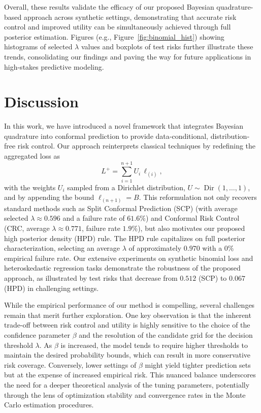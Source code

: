 \documentclass{article}
\begin{document}
Overall, these results validate the efficacy of our proposed Bayesian quadrature-based approach across synthetic settings, demonstrating that accurate risk control and improved utility can be simultaneously achieved through full posterior estimation. Figures (e.g., Figure~\ref{fig:binomial_hist}) showing histograms of selected \(\lambda\) values and boxplots of test risks further illustrate these trends, consolidating our findings and paving the way for future applications in high-stakes predictive modeling.

\section{Discussion}
In this work, we have introduced a novel framework that integrates Bayesian quadrature into conformal prediction to provide data‐conditional, distribution‐free risk control. Our approach reinterprets classical techniques by redefining the aggregated loss as 
\[
L^+ = \sum_{i=1}^{n+1} U_i\, \ell_{(i)},
\]
with the weights \(U_i\) sampled from a Dirichlet distribution, \(U \sim \operatorname{Dir}(1,\dots,1)\), and by appending the bound \(\ell_{(n+1)} = B\). This reformulation not only recovers standard methods such as Split Conformal Prediction (SCP) (with average selected \(\lambda \approx 0.596\) and a failure rate of \(61.6\%\)) and Conformal Risk Control (CRC, average \(\lambda \approx 0.771\), failure rate \(1.9\%\)), but also motivates our proposed high posterior density (HPD) rule. The HPD rule capitalizes on full posterior characterization, selecting an average \(\lambda\) of approximately \(0.970\) with a \(0\%\) empirical failure rate. Our extensive experiments on synthetic binomial loss and heteroskedastic regression tasks demonstrate the robustness of the proposed approach, as illustrated by test risks that decrease from \(0.512\) (SCP) to \(0.067\) (HPD) in challenging settings.

While the empirical performance of our method is compelling, several challenges remain that merit further exploration. One key observation is that the inherent trade-off between risk control and utility is highly sensitive to the choice of the confidence parameter \(\beta\) and the resolution of the candidate grid for the decision threshold \(\lambda\). As \(\beta\) is increased, the model tends to require higher thresholds to maintain the desired probability bounds, which can result in more conservative risk coverage. Conversely, lower settings of \(\beta\) might yield tighter prediction sets but at the expense of increased empirical risk. This nuanced balance underscores the need for a deeper theoretical analysis of the tuning parameters, potentially through the lens of optimization stability and convergence rates in the Monte Carlo estimation procedures.
\end{document}
